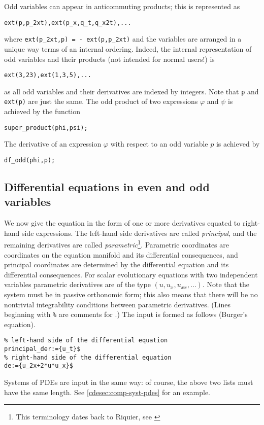 Odd variables can appear in anticommuting products; this is represented as
\begin{verbatim}
ext(p,p_2xt),ext(p_x,q_t,q_x2t),...
\end{verbatim}
where \texttt{ext(p\_2xt,p) = - ext(p,p\_2xt)} and the variables are arranged
in a unique way terms of an internal ordering. Indeed, the internal
representation of odd variables and their products (not intended for normal
users!) is
\begin{verbatim}
ext(3,23),ext(1,3,5),...
\end{verbatim}
as all odd variables and their derivatives are indexed by integers.
Note that \texttt{p} and \texttt{ext(p)} are just the same. The odd product of
two expressions $\varphi$ and $\psi$ is achieved by the \cdiff function
\begin{verbatim}
super_product(phi,psi);
\end{verbatim}
The derivative of an expression $\varphi$ with respect to an odd variable $p$
is achieved by
\begin{verbatim}
df_odd(phi,p);
\end{verbatim}

\subsection{Differential equations in even and odd variables}
\label{cdesec:diff-equat-even}

We now give the equation in the form of one or more derivatives equated to
right-hand side expressions. The left-hand side derivatives are called
\emph{principal}, and the remaining derivatives are called
\emph{parametric}\footnote{This terminology dates back to Riquier, see
  \cite{Marvan:2009}}. Parametric coordinates are coordinates on the equation manifold
and its differential consequences, and principal coordinates are determined
by the differential equation and its differential consequences.  For scalar
evolutionary equations with two independent variables parametric derivatives
are of the type $(u,u_x,u_{xx},\ldots)$.  Note that the system must be in
passive orthonomic form; this also means that there will be no nontrivial
integrability conditions between parametric derivatives. (Lines
beginning with \texttt{\%} are comments for \REDUCE.) The input is formed as
follows (Burger's equation).
\begin{verbatim}
% left-hand side of the differential equation
principal_der:={u_t}$
% right-hand side of the differential equation
de:={u_2x+2*u*u_x}$
\end{verbatim}
Systems of PDEs are input in the same way: of course, the above two lists must
have the same length. See \ref{cdesec:comp-syst-pdes} for an example.

